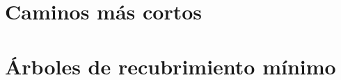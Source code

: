 \section{Caminos más cortos}

\clearpage

\clearpage
\section{Árboles de recubrimiento mínimo}

\clearpage

\clearpage

